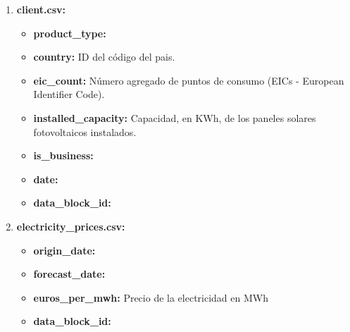 \documentclass[a4paper,12pt]{article}
\begin{document}
\begin{enumerate}
    \item \textbf{client.csv:}
    \begin{itemize}
        \item \textbf{product\_type:}
        \item \textbf{country:}
        ID del código del pais.
        \item \textbf{eic\_count:}
        Número agregado de puntos de consumo
        (EICs - European Identifier Code).
        \item \textbf{installed\_capacity:}
        Capacidad, en KWh, de los paneles solares
        fotovoltaicos instalados.
        \item \textbf{is\_business:}
        \item \textbf{date:}
        \item \textbf{data\_block\_id:}
    \end{itemize}

    \item \textbf{electricity\_prices.csv:}
    \begin{itemize}
        \item \textbf{origin\_date:}
        \item \textbf{forecast\_date:}
        \item \textbf{euros\_per\_mwh:}
        Precio de la electricidad en MWh
        \item \textbf{data\_block\_id:}
    \end{itemize}


\end{enumerate}
\end{document}

